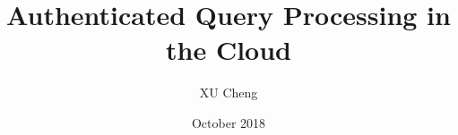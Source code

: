 \documentclass[12pt]{book}
\title{Authenticated Query Processing in the Cloud}
\author{XU Cheng}
\date{October 2018}
\begin{document}
\maketitle%

\frontmatter%

\declaration%
%
%
\tableofcontents%
\listoffigures%
\listoftables%

\mainmatter%

%

\backmatter%
\end{document}
